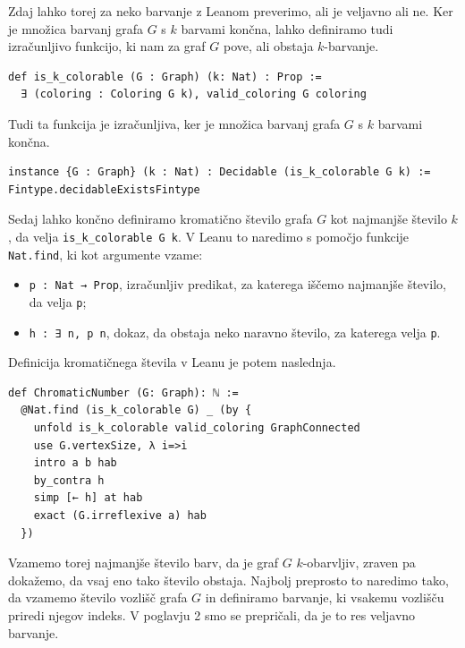 \documentclass[mat1]{fmfdelo}
\begin{document}
Zdaj lahko torej za neko barvanje z Leanom preverimo, ali je veljavno ali ne. 
Ker je množica barvanj grafa $G$ s $k$ barvami končna, lahko definiramo tudi izračunljivo funkcijo, ki nam 
za graf $G$ pove, ali obstaja $k$-barvanje.
\begin{lstlisting}
def is_k_colorable (G : Graph) (k: Nat) : Prop :=
  ∃ (coloring : Coloring G k), valid_coloring G coloring
\end{lstlisting}

Tudi ta funkcija je izračunljiva, ker je množica barvanj grafa $G$ s $k$ barvami končna.
\begin{lstlisting}
instance {G : Graph} (k : Nat) : Decidable (is_k_colorable G k) := Fintype.decidableExistsFintype
\end{lstlisting}

Sedaj lahko končno definiramo kromatično število grafa $G$ kot najmanjše število $k$, da velja
\lstinline{is_k_colorable G k}. V Leanu to naredimo s pomočjo funkcije \lstinline{Nat.find},
ki kot argumente vzame:
\begin{itemize}
    \item \lstinline{p : Nat → Prop}, izračunljiv predikat, za katerega iščemo najmanjše število, da velja \lstinline{p};
    \item \lstinline{h : ∃ n, p n}, dokaz, da obstaja neko naravno število, za katerega velja \lstinline{p}.
\end{itemize}

Definicija kromatičnega števila v Leanu je potem naslednja.
\begin{lstlisting}
def ChromaticNumber (G: Graph): ℕ :=
  @Nat.find (is_k_colorable G) _ (by {
    unfold is_k_colorable valid_coloring GraphConnected
    use G.vertexSize, λ i=>i
    intro a b hab
    by_contra h
    simp [← h] at hab
    exact (G.irreflexive a) hab
  })
\end{lstlisting}
Vzamemo torej najmanjše število barv, da je graf $G$ $k$-obarvljiv, zraven pa dokažemo, da vsaj eno tako število obstaja.
Najbolj preprosto to naredimo tako, da vzamemo število vozlišč grafa $G$ in definiramo barvanje, ki vsakemu vozlišču priredi njegov indeks.
V poglavju 2 smo se prepričali, da je to res veljavno barvanje.
\end{document}
